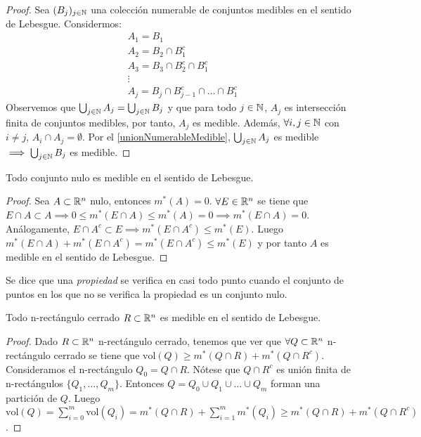 \begin{proof}
    Sea $(B_j)_{j \in \mathbb{N}}$ una colección numerable de conjuntos medibles en el sentido de Lebesgue. Considermos:
    \[\begin{matrix}
            A_1 = B_1                       \\
            A_2 = B_2 \cap B_1^c            \\
            A_3 = B_3 \cap B_2^c \cap B_1^c \\
            \vdots                          \\
            A_j = B_j \cap B_{j-1}^c \cap \ldots \cap B_1^c
        \end{matrix}\]
    Observemos que $\bigcup_{j \in \mathbb{N}} A_j = \bigcup_{j \in \mathbb{N}} B_j$ y que para
    todo $j \in \mathbb{N}$, $A_j$ es intersección finita de conjuntos medibles, por tanto,
    $A_j$ es medible. Además, $\forall i,j \in \mathbb{N}$ con $i \neq j$, $A_i \cap A_j =
        \emptyset$. Por el \cref{unionNumerableMedible}, $\bigcup_{j \in \mathbb{N}} A_j$ es
    medible $\implies \bigcup_{j \in \mathbb{N}} B_j$ es medible.
\end{proof}

\begin{proposición}
Todo conjunto nulo es medible en el sentido de Lebesgue.
\end{proposición}

\begin{proof}
    Sea $A \subset \mathbb{R}^n$ nulo, entonces $m^*(A) = 0$. $\forall E \in \mathbb{R}^n$ se tiene que $E \cap A \subset A \implies 0 \leq m^*(E \cap A) \leq m^*(A) = 0 \implies m^*(E \cap A) = 0$. Análogamente, $E \cap A^c \subset E \implies m^*(E \cap A^c) \leq m^*(E)$. Luego $m^*(E \cap A) + m^*(E \cap A^c) = m^*(E \cap A^c) \leq m^*(E)$ y por tanto $A$ es medible en el sentido de Lebesgue.
\end{proof}

\begin{definición}
Se dice que una \textit{propiedad} se verifica en casi todo punto cuando el conjunto de puntos en los que no se verifica la propiedad es un conjunto nulo.
\end{definición}

\begin{proposición}
Todo n-rectángulo cerrado $R \subset \mathbb{R}^n$ es medible en el sentido de Lebesgue.
\end{proposición}

\begin{proof}
    Dado $R \subset \mathbb{R}^n$ n-rectángulo cerrado, tenemos que ver que $\forall Q \subset \mathbb{R}^n$ n-rectángulo cerrado se tiene que $\text{vol}(Q) \geq m^*(Q \cap R) + m^*(Q \cap R^c)$. Consideramos el n-rectángulo $Q_0 = Q \cap R$. Nótese que $Q \cap R^c$ es unión finita de n-rectángulos $\{Q_1,\ldots, Q_m\}$. Entonces $Q = Q_0 \cup Q_1 \cup \ldots \cup Q_m$ forman una partición de $Q$. Luego $\text{vol}(Q) = \sum_{i=0}^m \text{vol}(Q_i) = m^*(Q \cap R) + \sum_{i=1}^m m^*(Q_i) \geq m^*(Q \cap R) + m^*(Q \cap R^c)$.
\end{proof}

